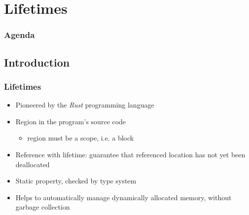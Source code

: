 \section{Lifetimes}

\begin{frame}
	\frametitle{Agenda}
\end{frame}

\subsection{Introduction}

\begin{frame}
	\frametitle{Lifetimes}
	\begin{itemize}[<+->]
		\item Pioneered by the \emph{Rust} programming language
		\item Region in the program's source code
		\begin{itemize}
			\item region must be a scope, i.e. a block
		\end{itemize}
		\item Reference with lifetime: guarantee that referenced location has not yet been deallocated
		\item Static property, checked by type system
		\item Helps to automatically manage dynamically allocated memory, without garbage collection
	\end{itemize}
\end{frame}
